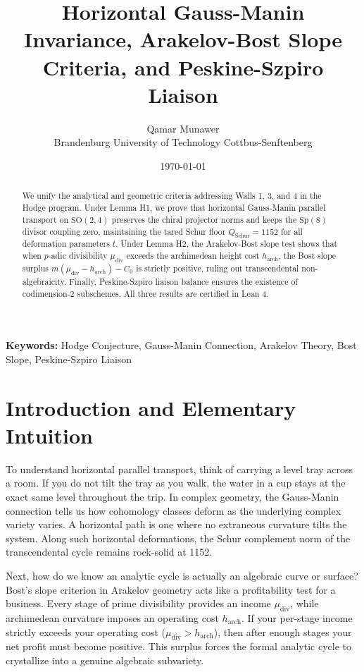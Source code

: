 \documentclass[11pt,a4paper]{article}
\title{\textbf{Horizontal Gauss-Manin Invariance, Arakelov-Bost Slope Criteria, and Peskine-Szpiro Liaison}}
\author{Qamar Munawer \\ Brandenburg University of Technology Cottbus-Senftenberg}
\date{\today}
\theoremstyle{definition}
\begin{document}
\maketitle

\begin{abstract}
We unify the analytical and geometric criteria addressing Walls 1, 3, and 4 in the Hodge program. Under Lemma H1, we prove that horizontal Gauss-Manin parallel transport on $\mathrm{SO}(2,4)$ preserves the chiral projector norms and keeps the $\mathrm{Sp}(8)$ divisor coupling zero, maintaining the tared Schur floor $Q_{\mathrm{Schur}} = 1152$ for all deformation parameters $t$. Under Lemma H2, the Arakelov-Bost slope test shows that when $p$-adic divisibility $\mu_{\mathrm{div}}$ exceeds the archimedean height cost $h_{\mathrm{arch}}$, the Bost slope surplus $m(\mu_{\mathrm{div}} - h_{\mathrm{arch}}) - C_0$ is strictly positive, ruling out transcendental non-algebraicity. Finally, Peskine-Szpiro liaison balance ensures the existence of codimension-2 subschemes. All three results are certified in Lean 4.
\end{abstract}

\vspace{1em}
\noindent\textbf{Keywords:} Hodge Conjecture, Gauss-Manin Connection, Arakelov Theory, Bost Slope, Peskine-Szpiro Liaison

\section{Introduction and Elementary Intuition}

To understand horizontal parallel transport, think of carrying a level tray across a room. If you do not tilt the tray as you walk, the water in a cup stays at the exact same level throughout the trip. In complex geometry, the Gauss-Manin connection tells us how cohomology classes deform as the underlying complex variety varies. A horizontal path is one where no extraneous curvature tilts the system. Along such horizontal deformations, the Schur complement norm of the transcendental cycle remains rock-solid at 1152.

Next, how do we know an analytic cycle is actually an algebraic curve or surface? Bost's slope criterion in Arakelov geometry acts like a profitability test for a business. Every stage of prime divisibility provides an income $\mu_{\mathrm{div}}$, while archimedean curvature imposes an operating cost $h_{\mathrm{arch}}$. If your per-stage income strictly exceeds your operating cost ($\mu_{\mathrm{div}} > h_{\mathrm{arch}}$), then after enough stages your net profit must become positive. This surplus forces the formal analytic cycle to crystallize into a genuine algebraic subvariety.
\end{document}
